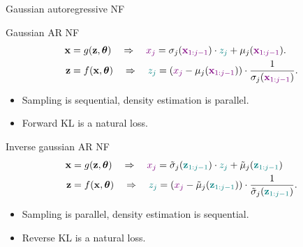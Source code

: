 \begin{frame}{Gaussian autoregressive NF}
	\begin{block}{Gaussian AR NF}
		\vspace{-0.6cm}
		\begin{align*}
			\mathbf{x} &= g(\mathbf{z}, \boldsymbol{\theta}) \quad \Rightarrow \quad {\color{violet}x_j} = \sigma_j ({\color{violet}\mathbf{x}_{1:j-1}}) \cdot {\color{teal} z_j} + \mu_j({\color{violet}\mathbf{x}_{1:j-1}}). \\
			\mathbf{z} &= f(\mathbf{x}, \boldsymbol{\theta}) \quad \Rightarrow \quad {\color{teal} z_j} = \left({\color{violet} x_j} - \mu_j({\color{violet}\mathbf{x}_{1:j-1}}) \right) \cdot \frac{1}{\sigma_j ({\color{violet} \mathbf{x}_{1:j-1}}) }.
		\end{align*}
		\vspace{-0.6cm}
		\begin{itemize}
			\item Sampling is sequential, density estimation is parallel.
			\item Forward KL is a natural loss.
		\end{itemize}
	\end{block}
	\begin{block}{Inverse gaussian AR NF}
		\vspace{-0.6cm}
		\begin{align*}
			\mathbf{x} &= g(\mathbf{z}, \boldsymbol{\theta}) \quad \Rightarrow \quad {\color{violet} x_j} = \tilde{\sigma}_j ({\color{teal}\mathbf{z}_{1:j-1}}) \cdot {\color{teal} z_j} + \tilde{\mu}_j({\color{teal}\mathbf{z}_{1:j-1}}) \\
			\mathbf{z} &= f(\mathbf{x}, \boldsymbol{\theta}) \quad \Rightarrow \quad {\color{teal}z_j} = \left( {\color{violet} x_j} - \tilde{\mu}_j({\color{teal}\mathbf{z}_{1:j-1}})\right) \cdot \frac{1}{\tilde{\sigma}_j ({\color{teal}\mathbf{z}_{1:j-1}}) }.
		\end{align*}
		\vspace{-0.6cm}
		\begin{itemize}
			\item Sampling is parallel, density estimation is sequential.
			\item Reverse KL is a natural loss.
		\end{itemize}
	\end{block}
\end{frame}

